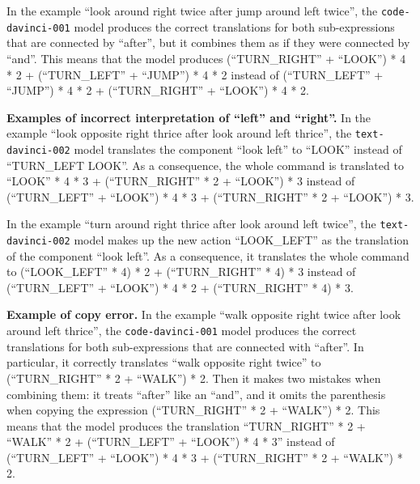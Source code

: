 In the example ``look around right twice after jump around left twice'', the \texttt{code-davinci-001} model produces the correct translations for both sub-expressions that are connected by ``after'', but it combines them as if they were connected by ``and''. This means that the model produces (``TURN\_RIGHT'' + ``LOOK'') * 4 * 2 + (``TURN\_LEFT'' + ``JUMP'') * 4 * 2 instead of (``TURN\_LEFT'' + ``JUMP'') * 4 * 2 + (``TURN\_RIGHT'' + ``LOOK'') * 4 * 2.

\textbf{Examples of incorrect interpretation of ``left'' and ``right''.}
In the example ``look opposite right thrice after look around left thrice'', the \texttt{text-davinci-002} model translates the component ``look left'' to ``LOOK'' instead of ``TURN\_LEFT LOOK''. As a consequence, the whole command is translated to ``LOOK'' * 4 * 3 + (``TURN\_RIGHT'' * 2 + ``LOOK'') * 3 instead of (``TURN\_LEFT'' + ``LOOK'') * 4 * 3 + (``TURN\_RIGHT'' * 2 + ``LOOK'') * 3.

In the example ``turn around right thrice after look around left twice'', the \texttt{text-davinci-002} model makes up the new action ``LOOK\_LEFT'' as the translation of the component ``look left''. As a consequence, it translates the whole command to (``LOOK\_LEFT'' * 4) * 2 + (``TURN\_RIGHT'' * 4) * 3 instead of (``TURN\_LEFT'' + ``LOOK'') * 4 * 2 + (``TURN\_RIGHT'' * 4) * 3.

\textbf{Example of copy error.}
In the example ``walk opposite right twice after look around left thrice'', the \texttt{code-davinci-001} model produces the correct translations for both sub-expressions that are connected with ``after''. In particular, it correctly translates ``walk opposite right twice'' to (``TURN\_RIGHT'' * 2 + ``WALK'') * 2.  Then it makes two mistakes when combining them: it treats ``after'' like an ``and'', and it omits the parenthesis when copying the expression (``TURN\_RIGHT'' * 2 + ``WALK'') * 2. This means that the model produces the translation ``TURN\_RIGHT'' * 2 + ``WALK'' * 2 + (``TURN\_LEFT'' + ``LOOK'') * 4 * 3'' instead of (``TURN\_LEFT'' + ``LOOK'') * 4 * 3 + (``TURN\_RIGHT'' * 2 + ``WALK'') * 2.